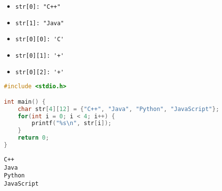 \begin{table}[H]
	\centering
\end{table}

\begin{itemize}
	\item \lstinline|str[0]: "C++"|
	\item \lstinline|str[1]: "Java"|
	\item \lstinline|str[0][0]: 'C'|
	\item \lstinline|str[0][1]: '+'|
	\item \lstinline|str[0][2]: '+'|
\end{itemize}

\vspace{0.5cm}


\begin{lstlisting}[language=C]
#include <stdio.h>

int main() {
    char str[4][12] = {"C++", "Java", "Python", "JavaScript"};
    for(int i = 0; i < 4; i++) {
        printf("%s\n", str[i]);
    }
    return 0;
}
\end{lstlisting}

\begin{tcolorbox}
	\begin{verbatim}
C++
Java
Python
JavaScript
	\end{verbatim}
\end{tcolorbox}

\newpage